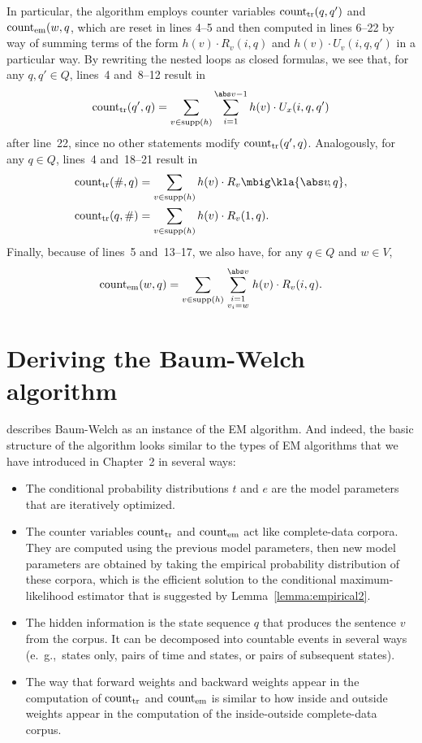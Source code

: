 In particular, the algorithm employs counter variables $\operatorname{count}_\mathrm{tr}(q,q')$
and $\operatorname{count}_\mathrm{em}(w,q$, which are reset in lines 4--5 and then computed in
lines 6--22 by way of summing terms of the form $h(v) \cdot R_v(i,q)$ and
$h(v)\cdot U_v(i,q,q')$ in a particular way. By rewriting the nested loops as
closed formulas, we see that, for any $q,q'\in Q$, lines~4 and~8--12 result in
\begin{equation}\label{eq:03-bw-start}
 \cnt_\mathrm{tr}(q',q) = \sum_{v\in\operatorname{supp}(h)} \sum_{i=1}^{\abs v-1} h(v) \cdot U_x(i,q,q')
\end{equation}
after line~22, since no other statements modify $\operatorname{count}_\mathrm{tr}(q',q)$.
Analogously, for any $q\in Q$, lines~4 and~18--21 result in
\begin{align}
 \cnt_\mathrm{tr}(\#,q) &= \sum_{v\in\operatorname{supp}(h)} h(v) \cdot R_v\mbig\kla{\abs v\!,q}, \\
 \cnt_\mathrm{tr}(q,\#) &= \sum_{v\in\operatorname{supp}(h)} h(v) \cdot R_v(1,q).
\end{align}
Finally, because of lines~5 and~13--17, we also have, for any $q\in Q$ and $w\in V$,
\begin{equation}\label{eq:03-bw-end}
 \cnt_\mathrm{em}(w,q) = \sum_{v\in\operatorname{supp}(h)} \sum_{{\scriptstyle i=1}\atop{\scriptstyle v_i=w}}^{\abs v} h(v) \cdot R_v(i,q).
\end{equation}

\section{Deriving the Baum-Welch algorithm}\label{sect:03-deriving}

\cite{jm09} describes Baum-Welch as an instance of the EM algorithm. And
indeed, the basic structure of the algorithm looks similar to the types of EM
algorithms that we have introduced in Chapter~2 in several ways:
\begin{itemize}
 \item The conditional probability distributions $t$ and $e$ are the model
  parameters that are iteratively optimized.
 \item The counter variables $\operatorname{count}_\mathrm{tr}$ and $\operatorname{count}_\mathrm{em}$ act like
  complete-data corpora. They are computed using the previous model parameters,
  then new model parameters are obtained by taking the empirical probability
  distribution of these corpora, which is the efficient solution to the
  conditional maximum-likelihood estimator that is suggested by
  Lemma~\ref{lemma:empirical2}.
 \item The hidden information is the state sequence $q$ that produces the
  sentence $v$ from the corpus. It can be decomposed into countable events in
  several ways (e.~g.,~states only, pairs of time and states, or pairs of
  subsequent states).
 \item The way that forward weights and backward weights appear in the
  computation of $\operatorname{count}_\mathrm{tr}$ and $\operatorname{count}_\mathrm{em}$ is similar to how
  inside and outside weights appear in the computation of the inside-outside
  complete-data corpus.
\end{itemize}

